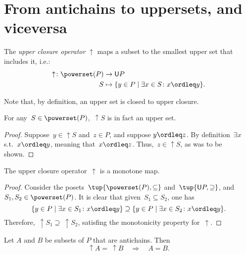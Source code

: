 \section{From antichains to uppersets, and viceversa}
\begin{definition}
    \label{def:upperclosure}
    The \emph{upper closure operator} $\uparrow$ maps a subset to the smallest upper set that includes it, i.e.:
    \begin{equation}
        \begin{aligned}
            \uparrow \colon \powerset(P)&\to \mathsf{U}P\\
            S&\mapsto \{y\in P \mid \exists x\in S \colon x\ordleq y\}.
        \end{aligned}
    \end{equation}
\end{definition}
\begin{remark}
    Note that, by definition, an upper set is closed to upper closure.
\end{remark}
\begin{remark}
    For any~$S\in \powerset(P)$,~$\uparrow S$ is in fact an upper set.
    \begin{proof}
        Suppose~$y\in \uparrow S$ and~$z\in P$, and suppose $y\ordleq z$. By definition~$\exists x$ s.t.~$x\ordleq y$, meaning that~$x\ordleq z$. Thus,~$z\in \uparrow S$, as was to be shown.
    \end{proof}
\end{remark}

\begin{lemma}
    The upper closure operator~$\uparrow$ is a monotone map.
\end{lemma}
\begin{proof}
    Consider the posets~$\tup{\powerset(P),\subseteq}$ and~$\tup{\mathsf{U}P,\supseteq}$, and~$S_1,S_2\in \powerset(P)$. It is clear that given~$S_1\subseteq S_2$, one has
    \begin{equation*}
        \{y\in P\mid \exists x\in S_1\colon x\ordleq y\} \supseteq \{y\in P\mid \exists x\in S_2\colon x\ordleq y\}.
    \end{equation*}
    Therefore,~$\uparrow S_1\supseteq \ \uparrow S_2$, satisfing the monotonicity property for~$\uparrow$.
\end{proof}

\begin{lemma}
    \label{up-cl-inj-antichains}
    Let $A$ and $B$ be subsets of $P$ that are antichains. Then
    \begin{equation*}
        \uparrow A = \ \uparrow B \quad \Rightarrow \quad A = B.
    \end{equation*}
\end{lemma}

